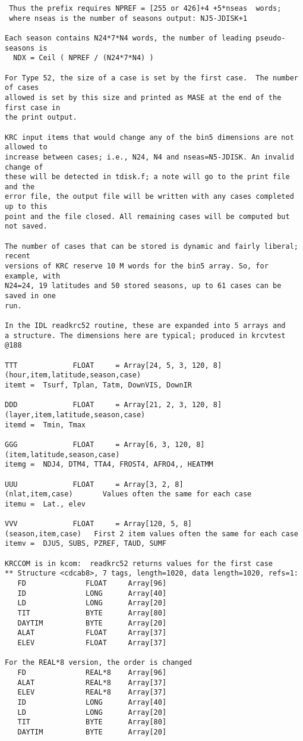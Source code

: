\begin{verbatim}
 Thus the prefix requires NPREF = [255 or 426]+4 +5*nseas  words;
 where nseas is the number of seasons output: NJ5-JDISK+1

Each season contains N24*7*N4 words, the number of leading pseudo-seasons is 
  NDX = Ceil ( NPREF / (N24*7*N4) )

For Type 52, the size of a case is set by the first case.  The number of cases
allowed is set by this size and printed as MASE at the end of the first case in
the print output.

KRC input items that would change any of the bin5 dimensions are not allowed to
increase between cases; i.e., N24, N4 and nseas=N5-JDISK. An invalid change of
these will be detected in tdisk.f; a note will go to the print file and the
error file, the output file will be written with any cases completed up to this
point and the file closed. All remaining cases will be computed but not saved.

The number of cases that can be stored is dynamic and fairly liberal; recent
versions of KRC reserve 10 M words for the bin5 array. So, for example, with
N24=24, 19 latitudes and 50 stored seasons, up to 61 cases can be saved in one
run.

In the IDL readkrc52 routine, these are expanded into 5 arrays and 
a structure. The dimensions here are typical; produced in krcvtest @188

TTT             FLOAT     = Array[24, 5, 3, 120, 8]
(hour,item,latitude,season,case)
itemt =  Tsurf, Tplan, Tatm, DownVIS, DownIR

DDD             FLOAT     = Array[21, 2, 3, 120, 8]
(layer,item,latitude,season,case)
itemd =  Tmin, Tmax

GGG             FLOAT     = Array[6, 3, 120, 8]
(item,latitude,season,case)
itemg =  NDJ4, DTM4, TTA4, FROST4, AFRO4,, HEATMM

UUU             FLOAT     = Array[3, 2, 8]
(nlat,item,case)       Values often the same for each case
itemu =  Lat., elev

VVV             FLOAT     = Array[120, 5, 8]
(season,item,case)   First 2 item values often the same for each case
itemv =  DJU5, SUBS, PZREF, TAUD, SUMF

KRCCOM is in kcom:  readkrc52 returns values for the first case
** Structure <cdcab8>, 7 tags, length=1020, data length=1020, refs=1:
   FD              FLOAT     Array[96]
   ID              LONG      Array[40]
   LD              LONG      Array[20]
   TIT             BYTE      Array[80]
   DAYTIM          BYTE      Array[20]
   ALAT            FLOAT     Array[37]
   ELEV            FLOAT     Array[37]

For the REAL*8 version, the order is changed
   FD              REAL*8    Array[96]
   ALAT            REAL*8    Array[37]
   ELEV            REAL*8    Array[37] 
   ID              LONG      Array[40]
   LD              LONG      Array[20]
   TIT             BYTE      Array[80]
   DAYTIM          BYTE      Array[20]
\end{verbatim}
